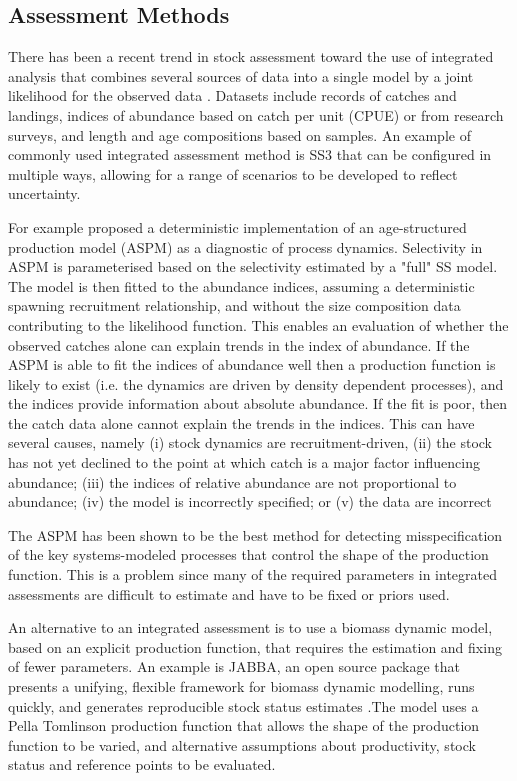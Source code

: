 \documentclass[12pt,halfline,a4paper,nonumbib]{ouparticle}
\begin{document}
\subsection{Assessment Methods}

There has been a recent trend in stock assessment toward the use of integrated analysis that combines several sources of data into a single model by a joint likelihood for the observed data \parencite[e.g.][]{doubleday1976least,fournier1982general,maunder2013review}. Datasets include records of catches and landings, indices of abundance based on catch per unit (CPUE) or from research surveys, and length and age compositions based on samples. An example of commonly used integrated assessment method is SS3 that can be configured in multiple ways, allowing for a range of scenarios to be developed to reflect uncertainty.

For example \cite{maunder2015contemporary} proposed a deterministic implementation of an age-structured production model (ASPM) as a diagnostic of process dynamics. Selectivity in ASPM is parameterised based on the selectivity estimated by a "full" SS model. The model is then fitted to the abundance indices, assuming a deterministic spawning recruitment relationship, and without the size composition data contributing to the likelihood function. This enables an evaluation of whether the observed catches alone can explain trends in the index of abundance. If the ASPM is able to fit the indices of abundance well then a production function is likely to exist (i.e. the dynamics are driven by density dependent processes), and the indices provide information about absolute abundance. If  the fit is poor, then the catch data alone cannot explain the trends in the indices. This can have several causes, namely (i) stock dynamics are recruitment-driven, (ii) the stock has not yet declined to the point at which catch is a major factor influencing abundance; (iii) the indices of relative abundance are not proportional to abundance;  (iv) the model is incorrectly specified; or (v) the data are incorrect

The ASPM has been shown \parencite{carvalho2017can} to be the best method for detecting misspecification of the key systems-modeled processes that control the shape of the production function. This is a problem since many of the required parameters in integrated assessments are difficult to estimate \parencite[e.g.][]{lee2011m,lee2012steepness} and have to be fixed or priors used. 

An alternative to an integrated assessment is to use a biomass dynamic model, based on an explicit production function, that requires the estimation and fixing of fewer parameters. An example is JABBA, an open source package that presents a unifying, flexible framework for biomass dynamic modelling, runs quickly, and generates reproducible stock status estimates \parencite{winker2018jabba}.The model uses a Pella Tomlinson production function that allows the shape of the production function to be varied, and alternative assumptions about productivity, stock status and reference points to be evaluated. 
\end{document}

